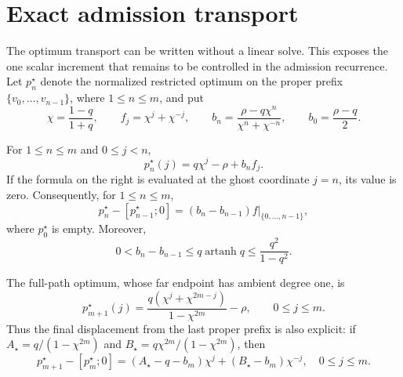 \section{Exact admission transport}
\label{sec:terminal-modal-admission}

The optimum transport can be written without a linear solve.  This exposes
the one scalar increment that remains to be controlled in the admission
recurrence.  Let $p_n^\star$ denote the normalized restricted optimum on the
proper prefix $\{v_0,\ldots,v_{n-1}\}$, where $1\le n\le m$, and put
\begin{equation}
 \chi=\frac{1-q}{1+q},\qquad
 f_j=\chi^j+\chi^{-j},\qquad
 b_n=\frac{\rho-q\chi^n}{\chi^n+\chi^{-n}},\qquad
 b_0=\frac{\rho-q}{2}.
 \label{eq:terminal-modal-prefix-parameters}
\end{equation}

\begin{lemma}
\label{lem:terminal-modal-prefix-optima}
For $1\le n\le m$ and $0\le j<n$,
\begin{equation}
 p_n^\star(j)=q\chi^j-\rho+b_nf_j.
 \label{eq:terminal-modal-prefix-optimum}
\end{equation}
If the formula on the right is evaluated at the ghost coordinate $j=n$,
its value is zero.  Consequently, for $1\le n\le m$,
\begin{equation}
 p_n^\star-[p_{n-1}^\star;0]
 =(b_n-b_{n-1})f\big|_{\{0,\ldots,n-1\}},
 \label{eq:terminal-modal-prefix-displacement}
\end{equation}
where $p_0^\star$ is empty.  Moreover,
\begin{equation}
 0<b_n-b_{n-1}
 \le q\operatorname{artanh}q
 \le\frac{q^2}{1-q^2}.
 \label{eq:terminal-modal-prefix-increment}
\end{equation}

The full-path optimum, whose far endpoint has ambient degree one, is
\begin{equation}
 p_{m+1}^\star(j)
 =\frac{q(\chi^j+\chi^{2m-j})}{1-\chi^{2m}}-\rho,
 \qquad 0\le j\le m.
 \label{eq:terminal-modal-full-optimum}
\end{equation}
Thus the final displacement from the last proper prefix is also explicit: if
$A_\star=q/(1-\chi^{2m})$ and
$B_\star=q\chi^{2m}/(1-\chi^{2m})$, then
\begin{equation}
 p_{m+1}^\star-[p_m^\star;0]
 =(A_\star-q-b_m)\chi^j+(B_\star-b_m)\chi^{-j},
 \quad 0\le j\le m.
 \label{eq:terminal-modal-final-displacement}
\end{equation}
\end{lemma}

